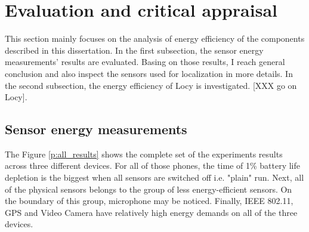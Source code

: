 \section{Evaluation and critical appraisal}
\label{s:evaluation}

\hspace{10pt} This section mainly focuses on the analysis of energy efficiency of the components described in this dissertation. In the first subsection, the sensor energy measurements' results are evaluated. Basing on those results, I reach general conclusion and also inspect the sensors used for localization in more details.  In the second subsection, the energy efficiency of Locy is investigated. [XXX go on Locy].

\subsection{Sensor energy measurements}

\hspace{10pt} The Figure \ref{p:all_results} shows the complete set of the experiments results across three different devices. For all of those phones, the time of 1\% battery life depletion is the biggest when all sensors are switched off i.e. "plain" run. Next, all of the physical sensors belongs to the group of less energy-efficient sensors. On the boundary of this group, microphone may be noticed. Finally, IEEE 802.11, GPS and Video Camera have relatively high energy demands on all of the three devices.

